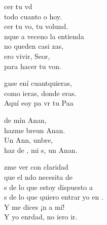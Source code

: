 \documentclass[12pt]{article}
\begin{document}
\begin{multicols*}{2}
\begin{cancion}%
	cer tu vd \\
	 todo cuanto o hoy.\\
	cer tu vo, tu volund.\\
\jump
	nque a veceno la entienda\\
	no queden casi zas,\\
	ero vivir, Seor,\\
	para hacer tu von.\\
\end{cancion}%

\begin{cancion}[Hágase][Ixcís]%
	gase ení cuantquieras, \\
	como ieras, donde eras.\\
	Aquí eoy pa vr tu Paa\\
\end{cancion}%

\begin{cancion}%
	 de mín Anan, \\
	hazme breun Anan.\\
	Un Ann, unbre,\\
	haz de , mi s, un Anan. \\
\end{cancion}%

\begin{cancion}%
	zme ver con claridad\\
	que el ndo necesita de \\
	s de lo que estoy dispuesto a  \\
	s de lo que quiero entrar yo en . \\
	Y  me dices ¡n a mí!  \\
	Y yo enrdad, no iero ir.\\
\end{cancion}%


\end{multicols*}
\end{document}
